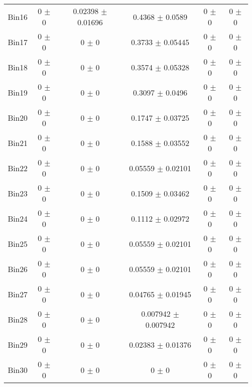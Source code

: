 \begin{tabular}{@{\extracolsep{4pt}}lccccc@{}}
     Bin16 & 0 $\pm$ 0 & 0.02398 $\pm$ 0.01696 & 0.4368 $\pm$ 0.0589 & 0 $\pm$ 0 & 0 $\pm$ 0 \\ 
     Bin17 & 0 $\pm$ 0 & 0 $\pm$ 0 & 0.3733 $\pm$ 0.05445 & 0 $\pm$ 0 & 0 $\pm$ 0 \\ 
     Bin18 & 0 $\pm$ 0 & 0 $\pm$ 0 & 0.3574 $\pm$ 0.05328 & 0 $\pm$ 0 & 0 $\pm$ 0 \\ 
     Bin19 & 0 $\pm$ 0 & 0 $\pm$ 0 & 0.3097 $\pm$ 0.0496 & 0 $\pm$ 0 & 0 $\pm$ 0 \\ 
     Bin20 & 0 $\pm$ 0 & 0 $\pm$ 0 & 0.1747 $\pm$ 0.03725 & 0 $\pm$ 0 & 0 $\pm$ 0 \\ 
     Bin21 & 0 $\pm$ 0 & 0 $\pm$ 0 & 0.1588 $\pm$ 0.03552 & 0 $\pm$ 0 & 0 $\pm$ 0 \\ 
     Bin22 & 0 $\pm$ 0 & 0 $\pm$ 0 & 0.05559 $\pm$ 0.02101 & 0 $\pm$ 0 & 0 $\pm$ 0 \\ 
     Bin23 & 0 $\pm$ 0 & 0 $\pm$ 0 & 0.1509 $\pm$ 0.03462 & 0 $\pm$ 0 & 0 $\pm$ 0 \\ 
     Bin24 & 0 $\pm$ 0 & 0 $\pm$ 0 & 0.1112 $\pm$ 0.02972 & 0 $\pm$ 0 & 0 $\pm$ 0 \\ 
     Bin25 & 0 $\pm$ 0 & 0 $\pm$ 0 & 0.05559 $\pm$ 0.02101 & 0 $\pm$ 0 & 0 $\pm$ 0 \\ 
     Bin26 & 0 $\pm$ 0 & 0 $\pm$ 0 & 0.05559 $\pm$ 0.02101 & 0 $\pm$ 0 & 0 $\pm$ 0 \\ 
     Bin27 & 0 $\pm$ 0 & 0 $\pm$ 0 & 0.04765 $\pm$ 0.01945 & 0 $\pm$ 0 & 0 $\pm$ 0 \\ 
     Bin28 & 0 $\pm$ 0 & 0 $\pm$ 0 & 0.007942 $\pm$ 0.007942 & 0 $\pm$ 0 & 0 $\pm$ 0 \\ 
     Bin29 & 0 $\pm$ 0 & 0 $\pm$ 0 & 0.02383 $\pm$ 0.01376 & 0 $\pm$ 0 & 0 $\pm$ 0 \\ 
     Bin30 & 0 $\pm$ 0 & 0 $\pm$ 0 & 0 $\pm$ 0 & 0 $\pm$ 0 & 0 $\pm$ 0 \\ 
\hline\hline
  \end{tabular}
